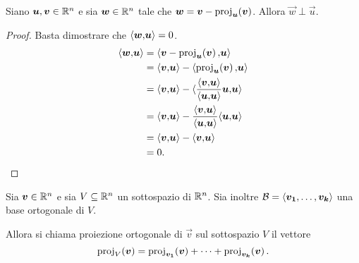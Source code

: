 \begin{proposition}
    Siano $\vec u, \vec v \in \R^n$ e sia $\vec w \in \R^n$ tale che $\vec w = \vec v - \proj{\vec v}{\vec u}$. Allora $\vec w \perp \vec u$.
\end{proposition}
\begin{proof}
    Basta dimostrare che $\innerprod{\vec w}{\vec u} = 0$.
    \begin{align*}
        \innerprod{\vec w}{\vec u} &= \innerprod{\vec v - \proj{\vec v}{\vec u}}{\vec u} \\
        &= \innerprod{\vec v}{\vec u} - \innerprod{\proj{\vec v}{\vec u}}{\vec u} \\
        &= \innerprod{\vec v}{\vec u} - \innerprod{\frac{\innerprod{\vec v}{\vec u}}{\innerprod{\vec u}{\vec u}}\vec u}{\vec u} \\
        &= \innerprod{\vec v}{\vec u} - \frac{\innerprod{\vec v}{\vec u}}{\innerprod{\vec u}{\vec u}}\innerprod{\vec u}{\vec u} \\
        &= \innerprod{\vec v}{\vec u} - \innerprod{\vec v}{\vec u} \\
        &= 0. \qedhere
    \end{align*}
\end{proof}

\begin{definition}
    Sia $\vec v \in \R^n$ e sia $V \subseteq \R^n$ un sottospazio di $\R^n$. Sia inoltre $\mathcal{B} = \basis{\vec{v_1}, \dots, \vec{v_k}}$ una base ortogonale di $V$.
    
    Allora si chiama proiezione ortogonale di $\vec v$ sul sottospazio $V$ il vettore \[
        \proj{\vec v}{V} = \proj{\vec v}{\vec{v_1}} + \dots + \proj{\vec v}{\vec{v_k}}.
    \]
\end{definition}

